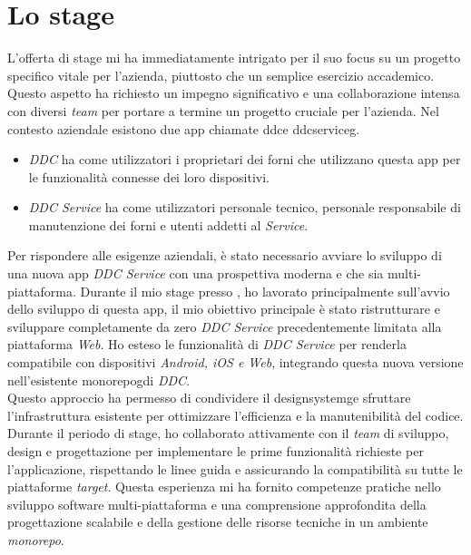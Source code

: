 \section{Lo stage}
L'offerta di stage mi ha immediatamente intrigato per il suo focus su un progetto specifico vitale per l'azienda, piuttosto che un semplice esercizio accademico.
Questo aspetto ha richiesto un impegno significativo e una collaborazione intensa con diversi \textit{team} per portare a termine un progetto cruciale per l'azienda.
Nel contesto aziendale esistono due app chiamate \gls{ddc}\glox e \gls{ddcserviceg}\glox.
\begin{itemize}
    \item \textit{DDC} ha come utilizzatori i proprietari dei forni che utilizzano questa app per le funzionalità connesse dei loro dispositivi.
    \item \textit{DDC Service} ha come utilizzatori personale tecnico, personale responsabile di manutenzione dei forni e utenti addetti al \textit{Service}.
\end{itemize}
Per rispondere alle esigenze aziendali, è stato necessario avviare lo sviluppo di una nuova app \textit{DDC Service} con una prospettiva moderna e che sia multi-piattaforma.
Durante il mio stage presso \myAzienda, ho lavorato principalmente sull'avvio dello sviluppo di questa app, il mio obiettivo principale è stato ristrutturare e sviluppare completamente da zero \textit{DDC Service} precedentemente limitata alla piattaforma \textit{Web}.
Ho esteso le funzionalità di \textit{DDC Service} per renderla compatibile con dispositivi \textit{Android, iOS e Web}, integrando questa nuova versione nell'esistente \gls{monorepog}\glox di \textit{DDC}.
\\Questo approccio ha permesso di condividere il \gls{designsystemg}\glox e sfruttare l'infrastruttura esistente per ottimizzare l'efficienza e la manutenibilità del codice.
\\Durante il periodo di stage, ho collaborato attivamente con il \textit{team} di sviluppo, design e progettazione per implementare le prime funzionalità richieste per l'applicazione, rispettando le linee guida e assicurando la compatibilità su tutte le piattaforme \textit{target}.
Questa esperienza mi ha fornito competenze pratiche nello sviluppo software multi-piattaforma e una comprensione approfondita della progettazione scalabile e della gestione delle risorse tecniche in un ambiente \textit{monorepo}.


\newpage